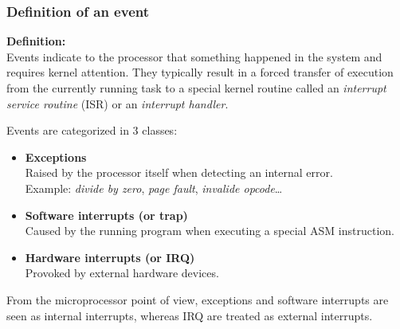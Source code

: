 \begin{frame}
  \frametitle{Definition of an event}

  {\bf Definition:}\\
  Events indicate to the processor that something happened in the system
  and requires kernel attention. They typically result in a forced transfer of
  execution from the currently running task to a special kernel routine  called
  an {\em interrupt service routine} (ISR) or an {\em interrupt handler}.\\

  \-

  Events are categorized in 3 classes:

  \begin{itemize}
    \item {\bf Exceptions}\\
      Raised by the processor itself when detecting an internal error.\\
      Example: {\em divide by zero}, {\em page fault}, {\em invalide opcode}\ldots
    \item {\bf Software interrupts (or trap)}\\
      Caused by the running program when executing a special ASM instruction.
    \item {\bf Hardware interrupts (or IRQ)}\\
      Provoked by external hardware devices.
  \end{itemize}

  \-

  From the microprocessor point of view, exceptions and software interrupts are
  seen as internal interrupts, whereas IRQ are treated as external interrupts.

\end{frame}

%
%
%

